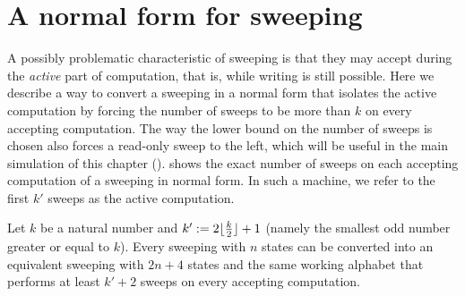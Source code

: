 \section{A normal form for sweeping \kDLAs}\label{sec:equiv-swep-dla}
A possibly problematic characteristic of sweeping \kDLAs is that they may accept during the \emph{active} part of computation, that is, while writing is still possible.
Here we describe a way to convert a sweeping \kDLA in a normal form that isolates the active computation by forcing the number of sweeps to be more than $k$ on every accepting computation.
The way the lower bound on the number of sweeps is chosen also forces a read-only sweep to the left, which will be useful in the main simulation of this chapter ().
 shows the exact number of sweeps on each accepting computation of a sweeping \kDLA in normal form.
In such a machine, we refer to the first $k'$ sweeps as the active computation.
\begin{thrm}\label{thm:equiv-swep-dla}
	Let $k$ be a natural number and $k':=2\lfloor \frac{k}{2} \rfloor+1$ (namely the smallest odd number greater or equal to $k$).
	Every sweeping \kDLA with $n$ states can be converted into an equivalent sweeping \kDLA with $2n+4$ states and the same working alphabet that performs at least $k'+2$ sweeps on every accepting computation.
\end{thrm}
